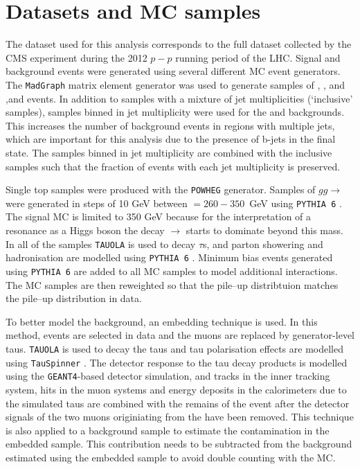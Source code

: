 \section{Datasets and \acl{MC} samples}
\label{sec:hhh_datasets}
The dataset used for this analysis corresponds to the full dataset collected by the CMS experiment during the 2012 $p-p$ 
running period of the LHC. 
Signal and background events were generated using several different \ac{MC} event generators. The \texttt{MadGraph}
\cite{madgraph} matrix element generator was used to generate samples of \Wjets, \Zellell, \ttbar and \ZZ ,\WZ and \WW
events. In addition to samples with a mixture of jet multiplicities (`inclusive' samples), samples binned in jet multiplicity
were used for the \Wjets and \Zellell backgrounds. This increases the number of background events
in regions with multiple jets, which are important for this analysis due to the presence of b-jets in the final state. 
The samples binned in jet multiplicity are combined with the
inclusive samples such that the fraction of events with each jet multiplicity is preserved.

Single top samples were produced with the \texttt{POWHEG} \cite{powheg1,powheg2} generator. Samples of $gg\rightarrow$\Htohhtobbtautau
were generated in steps of 10 GeV between \mH $= 260 - 350$~GeV using \texttt{PYTHIA 6} \cite{pythia64}. The signal
\ac{MC} is limited to 350 GeV because for the interpretation of a resonance as a Higgs boson the decay \PHiggs $\rightarrow$ \ttbar
starts to dominate beyond this mass. In all of the samples
\texttt{TAUOLA} \cite{tauola} is used to decay $\tau$s, and parton showering and hadronisation are modelled using \texttt{PYTHIA 6} \cite{pythia64}.
Minimum bias events generated using \texttt{PYTHIA 6} are added to all \ac{MC} samples to model additional
interactions. The \ac{MC} samples are then reweighted so that the pile--up distribtuion matches the
pile--up distribution in data.

To better model the \Ztautau background, an embedding technique is used. In this method, 
\Zmm events are selected in data and the muons are replaced by generator-level taus. \texttt{TAUOLA} is used
to decay the taus and tau polarisation effects are modelled using \texttt{TauSpinner} \cite{TauSpinner}. The detector
response to the tau decay products is modelled using the \texttt{GEANT4}-based \cite{Geant4} detector simulation, and 
tracks in the inner tracking system, hits in the muon systems and energy deposits in the calorimeters
due to the simulated taus are combined with the remains of the \Zmm event after the detector signals
of the two muons originiating from the \PZ have been removed. This technique is also applied to 
a \ttbar background sample to estimate the \ttbar contamination in the embedded sample. This contribution
needs to be subtracted from the \Ztautau background estimated using the embedded \Zmm sample to
avoid double counting with the \ttbar \ac{MC}.

